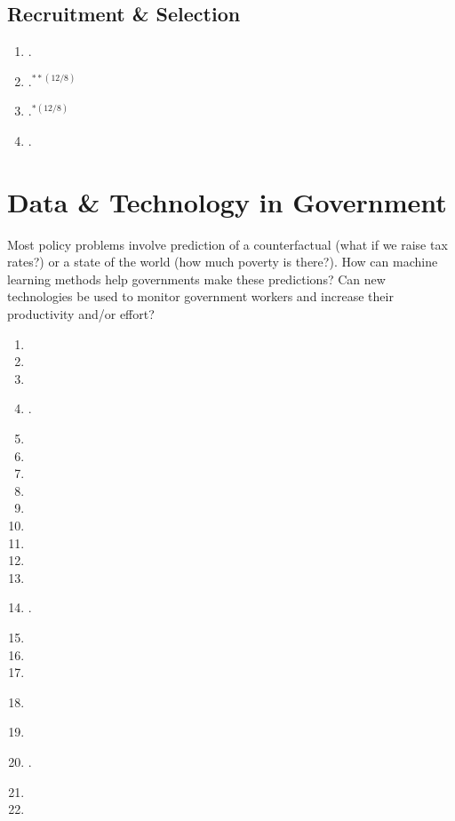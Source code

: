 \documentclass[11pt]{article}
\begin{document}
\subsection{Recruitment \& Selection}

\begin{enumerate}
\item {}.
\item \textbf{}.$^{**(12/8)}$
\item {}.$^{*(12/8)}$
\item {}.
\end{enumerate}

\section{Data \& Technology in Government}
Most policy problems involve prediction of a counterfactual (what if we raise tax rates?) or a state of the world (how much poverty is there?). How can machine learning methods help governments make these predictions? Can new technologies be used to monitor government workers and increase their productivity and/or effort?

\begin{enumerate}
\item {}
\item {}
\item {}
\item {}.
\item {}
\item {}
\item {}
\item {}
\item {}
\item {}
\item {}
\item {}
\item {}
\item {}.
\item {}
\item {}
\item {}
\item \textbf{}
\item \textbf{}
\item {}.
\item {}
\item {}
\end{enumerate}


\end{document}
